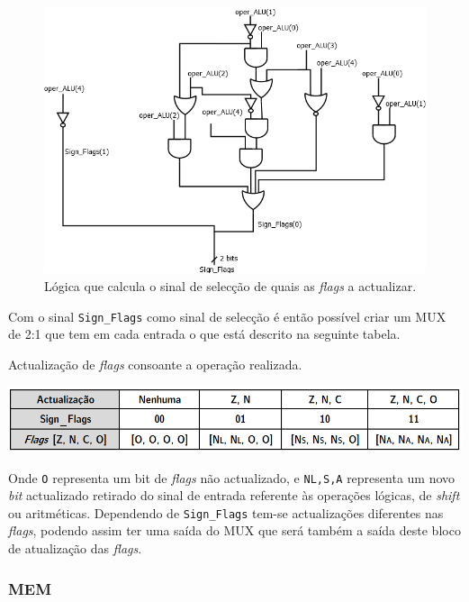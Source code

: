 \documentclass[11pt]{article}
\numberwithin{equation}{section}
\begin{document}
\begin{figure}[H]
	\centering
	\includegraphics[keepaspectratio=true, scale=0.40]{imagens/Sign_Flags}
	\caption{Lógica que calcula o sinal de selecção de quais as \textit{flags} a actualizar.}
	\vspace{-0.8em}
\end{figure}

Com o sinal \texttt{Sign\_Flags} como sinal de selecção é então possível criar um MUX de 2:1 que tem em cada entrada o que está descrito na seguinte tabela.

\vspace{1.5mm}
\begin{table}[h]
	\centering
	\caption{Actualização de \textit{flags} consoante a operação realizada.}
	\vspace{-2mm}
 	\includegraphics[keepaspectratio=true, scale=0.45]{tabelas/tabelaFlags}
\end{table}

Onde \texttt{O} representa um bit de \textit{flags} não actualizado, e \texttt{N{\scriptsize {L,S,A}}} representa um novo \textit{bit} actualizado retirado do sinal de entrada referente às operações lógicas, de \textit{shift} ou aritméticas. Dependendo de \texttt{Sign\_Flags} tem-se actualizações diferentes nas \textit{flags}, podendo assim ter uma saída do MUX que será também a saída deste bloco de atualização das \textit{flags}.

\subsubsection{MEM}
\end{document}
